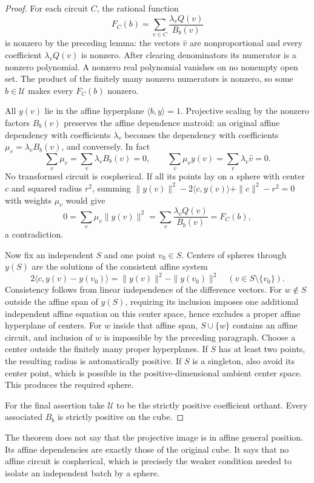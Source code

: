 \documentclass[11pt]{article}
\begin{document}
\begin{proof}
For each circuit $C$, the rational function
\[
 F_C(b)=\sum_{v\in C}\frac{\lambda_v Q(v)}{B_b(v)}
\]
is nonzero by the preceding lemma: the vectors $\widehat v$ are
nonproportional and every coefficient $\lambda_vQ(v)$ is nonzero.
After clearing denominators its numerator is a nonzero polynomial.
A nonzero real polynomial vanishes on no nonempty open set. The
product of the finitely many nonzero numerators is nonzero, so some
$b\in\mathcal U$ makes every $F_C(b)$ nonzero.

All $y(v)$ lie in the affine hyperplane $\langle b,y\rangle=1$.
Projective scaling by the nonzero factors $B_b(v)$ preserves the
affine dependence matroid: an original affine dependency with
coefficients $\lambda_v$ becomes the dependency with coefficients
$\mu_v=\lambda_v B_b(v)$, and conversely. In fact
\[
 \sum_v\mu_v=\sum_v\lambda_v B_b(v)=0,
 \qquad \sum_v\mu_v y(v)=\sum_v\lambda_v\widehat v=0.
\]
No transformed circuit is cospherical. If all its points lay on a
sphere with center $c$ and squared radius $r^2$, summing
$\|y(v)\|^2-2\langle c,y(v)\rangle+\|c\|^2-r^2=0$ with weights
$\mu_v$ would give
\[
 0=\sum_v\mu_v\|y(v)\|^2
   =\sum_v\frac{\lambda_vQ(v)}{B_b(v)}=F_C(b),
\]
a contradiction.

Now fix an independent $S$ and one point $v_0\in S$.
Centers of spheres through $y(S)$ are the solutions of the
consistent affine system
\[
 2\langle c,y(v)-y(v_0)\rangle
   =\|y(v)\|^2-\|y(v_0)\|^2\quad(v\in S\setminus\{v_0\}).
\]
Consistency follows from linear independence of the difference
vectors. For $w\notin S$ outside the affine span of $y(S)$,
requiring its inclusion imposes one additional independent affine
equation on this center space, hence excludes a proper affine
hyperplane of centers. For $w$ inside that affine span, $S\cup\{w\}$
contains an affine circuit, and inclusion of $w$ is impossible by
the preceding paragraph. Choose a center outside the finitely many
proper hyperplanes. If $S$ has at least two points, the resulting
radius is automatically positive. If $S$ is a singleton, also avoid
its center point, which is possible in the positive-dimensional
ambient center space. This produces the required sphere.

For the final assertion take $\mathcal U$ to be the strictly
positive coefficient orthant. Every associated $B_b$ is strictly
positive on the cube.
\end{proof}

The theorem does not say that the projective image is in affine
general position. Its affine dependencies are exactly those of the
original cube. It says that no affine circuit is cospherical, which
is precisely the weaker condition needed to isolate an independent
batch by a sphere.
\end{document}

